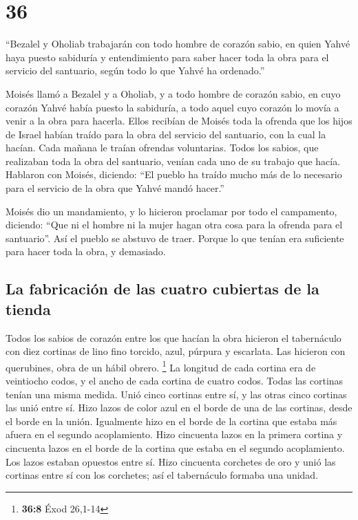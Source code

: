 \hypertarget{section-35}{%
\section{36}\label{section-35}}

 ``Bezalel y Oholiab trabajarán con todo hombre de corazón
sabio, en quien Yahvé haya puesto sabiduría y entendimiento para saber
hacer toda la obra para el servicio del santuario, según todo lo que
Yahvé ha ordenado.''

 Moisés llamó a Bezalel y a Oholiab, y a todo hombre de
corazón sabio, en cuyo corazón Yahvé había puesto la sabiduría, a todo
aquel cuyo corazón lo movía a venir a la obra para hacerla.
 Ellos recibían de Moisés toda la ofrenda que los hijos de
Israel habían traído para la obra del servicio del santuario, con la
cual la hacían. Cada mañana le traían ofrendas voluntarias.
 Todos los sabios, que realizaban toda la obra del
santuario, venían cada uno de su trabajo que hacía. 
Hablaron con Moisés, diciendo: ``El pueblo ha traído mucho más de lo
necesario para el servicio de la obra que Yahvé mandó hacer.''

 Moisés dio un mandamiento, y lo hicieron proclamar por
todo el campamento, diciendo: ``Que ni el hombre ni la mujer hagan otra
cosa para la ofrenda para el santuario''. Así el pueblo se abstuvo de
traer.  Porque lo que tenían era suficiente para hacer
toda la obra, y demasiado.

\hypertarget{la-fabricaciuxf3n-de-las-cuatro-cubiertas-de-la-tienda}{%
\subsection{La fabricación de las cuatro cubiertas de la
tienda}\label{la-fabricaciuxf3n-de-las-cuatro-cubiertas-de-la-tienda}}

 Todos los sabios de corazón entre los que hacían la obra
hicieron el tabernáculo con diez cortinas de lino fino torcido, azul,
púrpura y escarlata. Las hicieron con querubines, obra de un hábil
obrero. \footnote{\textbf{36:8} Éxod 26,1-14}  La longitud
de cada cortina era de veintiocho codos, y el ancho de cada cortina de
cuatro codos. Todas las cortinas tenían una misma medida.
 Unió cinco cortinas entre sí, y las otras cinco cortinas
las unió entre sí.  Hizo lazos de color azul en el borde
de una de las cortinas, desde el borde en la unión. Igualmente hizo en
el borde de la cortina que estaba más afuera en el segundo acoplamiento.
 Hizo cincuenta lazos en la primera cortina y cincuenta
lazos en el borde de la cortina que estaba en el segundo acoplamiento.
Los lazos estaban opuestos entre sí.  Hizo cincuenta
corchetes de oro y unió las cortinas entre sí con los corchetes; así el
tabernáculo formaba una unidad.

